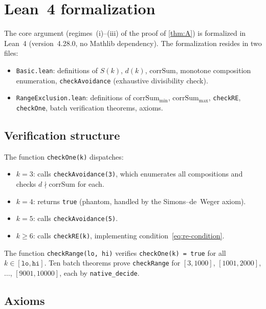\documentclass[11pt, a4paper]{amsart}
\theoremstyle{plain}
\theoremstyle{definition}
\theoremstyle{remark}
\newcommand{\corrSum}{\mathrm{corrSum}}
\begin{document}
\section{Lean~4 formalization}\label{sec:lean}

The core argument (regimes~(i)--(iii) of the proof of
\cref{thm:A}) is formalized in Lean~4 (version~4.28.0,
no Mathlib dependency).  The formalization resides in
two files:
\begin{itemize}
  \item \texttt{Basic.lean}: definitions of $S(k)$, $d(k)$,
    $\corrSum$, monotone composition enumeration,
    \texttt{checkAvoidance} (exhaustive divisibility check).
  \item \texttt{RangeExclusion.lean}: definitions of
    $\corrSum_{\min}$, $\corrSum_{\max}$, \texttt{checkRE},
    \texttt{checkOne}, batch verification theorems, axioms.
\end{itemize}

\subsection{Verification structure}

The function \texttt{checkOne(k)} dispatches:
\begin{itemize}
  \item $k = 3$: calls \texttt{checkAvoidance(3)}, which
    enumerates all compositions and checks $d \nmid \corrSum$
    for each.
  \item $k = 4$: returns \texttt{true} (phantom, handled by
    the Simons--de~Weger axiom).
  \item $k = 5$: calls \texttt{checkAvoidance(5)}.
  \item $k \geq 6$: calls \texttt{checkRE(k)}, implementing
    condition~\eqref{eq:re-condition}.
\end{itemize}

The function \texttt{checkRange(lo, hi)} verifies
\texttt{checkOne(k) = true} for all $k \in [\texttt{lo},
\texttt{hi}]$.  Ten batch theorems prove
\texttt{checkRange} for $[3, 1000]$, $[1001, 2000]$,
$\ldots$, $[9001, 10000]$, each by \texttt{native\_decide}.

\subsection{Axioms}
\end{document}

